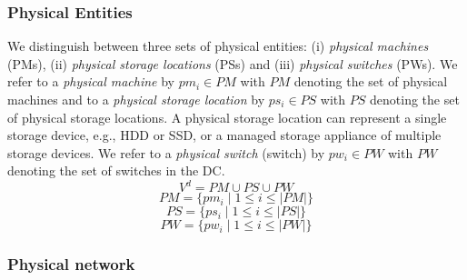 \documentclass[conference]{IEEEtran}
\begin{document}
\subsubsection{Physical Entities}
We distinguish between three sets of physical entities: (i) \textit{physical machines} (PMs), (ii) \textit{physical storage locations} (PSs) and (iii) \textit{physical switches} (PWs). 
We refer to a \textit{physical machine} by $pm_i \in PM$ with $PM$ denoting the set of physical machines and to a \textit{physical storage location} by $ps_i \in PS$ with $PS$ denoting the set of physical storage locations. A physical storage location can represent a single storage device, e.g., HDD or SSD, or a managed storage appliance of multiple storage devices. 
We refer to a \textit{physical switch} (switch) by $ pw_i \in PW$ with $PW$ denoting the set of switches in the DC.
\begin{equation}
V^{d}=PM \cup PS \cup PW
\end{equation}
\begin{equation}
PM = \{ pm_i \mid 1 \leq i \leq \left\vert PM \right\vert \}
\end{equation}
\begin{equation}
PS = \{ ps_i \mid 1 \leq i \leq \left\vert PS \right\vert \}
\end{equation}
\begin{equation}
PW = \{ pw_i \mid 1 \leq i \leq \left\vert PW \right\vert \}
\end{equation}

\subsubsection{Physical network}
\end{document}
